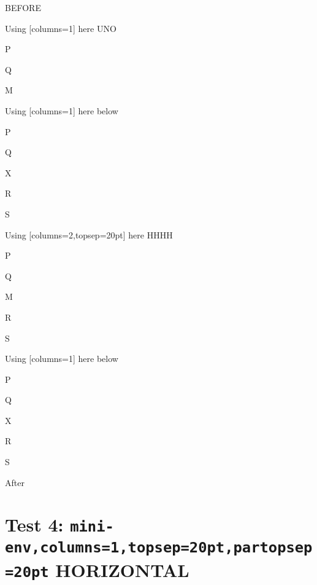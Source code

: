 \documentclass[10pt]{article}
\begin{document}
BEFORE
\begin{enumext}[columns=2]
\item Using [columns=1] here UNO
  \begin{enumext}[columns=1,topsep=20pt]%
     \item  P \item Q \item M %
  \end{enumext}

\item Using [columns=1] here below
\begin{enumext}[columns=1,topsep=20pt]%
     \item  P \item Q \item X  \item R \item S
  \end{enumext}

\columnbreak

\item Using [columns=2,topsep=20pt] here HHHH
  \begin{enumext}[columns=2,topsep=20pt]%
    \item  P \item Q \item M \item R \item S
  \end{enumext}

\item Using [columns=1] here below
\begin{enumext}[columns=1,topsep=20pt]%
     \item  P \item Q \item X  \item R \item S
  \end{enumext}

\end{enumext}
After

\newpage

\section{Test 4: \texttt{mini-env,columns=1,topsep=20pt,partopsep=20pt} HORIZONTAL}
\end{document}
